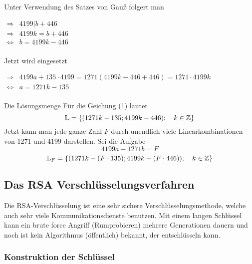 \documentclass[main.tex]{subfiles}
\begin{document}
\begin{Beispiel}
	Unter Verwendung des Satzes von Gauß folgert man

	$\begin{array}{rl}
		\Rightarrow & 4199 | b + 446  \\
		\Rightarrow & 4199k = b + 446 \\
		\Leftrightarrow & b =  4199k - 446 \\
	\end{array}$

	Jetzt wird eingesetzt

	$\begin{array}{rl}
		\Rightarrow & 4199a +135\cdot4199 = 1271 (4199k -446 + 446 ) = 1271 \cdot 4199k \\
		\Leftrightarrow & a = 1271k - 135 \\
	\end{array}$

	Die Lösungsmenge Für die Geichung (1) lautet
	$$\mathbb{L} = \{ (1271k -135 ; 4199k - 446) ; \quad k \in \mathbb{Z}  \}$$
	Jetzt kann man jede ganze Zahl $F$ durch unendlich viele Linearkombinationen von 1271 und 4199 darstellen. Sei die Aufgabe
	$$ 4199 a - 1271 b = F$$
	$$\mathbb{L}_{F} = \{ (1271k -  (F \cdot 135) ; 4199k - (F \cdot 446)) ; \quad k \in \mathbb{Z}  \}$$
\end{Beispiel}


\subsection{Das RSA Verschlüsselungsverfahren}


Die RSA-Verschlüsselung ist eine sehr sichere Verschlüsselungsmethode, welche auch sehr viele Kommunikationsdienste benutzen. Mit einem langen Schlüssel kann ein brute force Angriff (Rumprobieren) mehrere Generationen dauern und noch ist kein Algorithmus (öffentlich) bekannt, der entschlüsseln kann.

\subsubsection{Konstruktion der Schlüssel}
\end{document}
